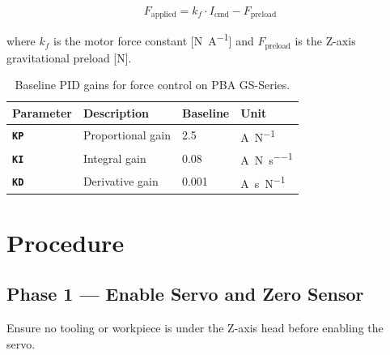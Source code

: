 \documentclass[11pt, a4paper]{article}
\newenvironment{warningbox}{%
  \begin{tcolorbox}[breakable,enhanced,colback=WarningBg,colframe=WarningOrange,
    leftrule=4pt,rightrule=0.4pt,toprule=0.4pt,bottomrule=0.4pt,arc=2pt,
    fontupper=\small,before upper={\textcolor{WarningOrange}{\textbf{\faExclamationTriangle\quad WARNING}}\par\smallskip},
    left=8pt,right=8pt,top=6pt,bottom=6pt]}{\end{tcolorbox}}
\newcommand{\acsparam}[1]{\texttt{\textcolor{ACSKeyword}{\bfseries#1}}}
\begin{document}
\begin{equation}
  F_{\text{applied}} = k_f \cdot I_{\text{cmd}} - F_{\text{preload}}
\end{equation}

where $k_f$ is the motor force constant [\si{\newton\per\ampere}] and
$F_{\text{preload}}$ is the Z-axis gravitational preload [\si{\newton}].

\begin{table}[H]
  \centering
  
  \caption{Baseline PID gains for force control on PBA GS-Series.}
  \begin{tabular}{@{} l l l l @{}}
  \toprule
  \rowcolor{PBATableHeader}
    \textbf{Parameter} & \textbf{Description} & \textbf{Baseline} & \textbf{Unit} \\
  \midrule
    \acsparam{KP} & Proportional gain & 2.5 & \si{\ampere\per\newton} \\
    \rowcolor{PBALightGray}
    \acsparam{KI} & Integral gain & 0.08 & \si{\ampere\per\newton\per\second} \\
    \acsparam{KD} & Derivative gain & 0.001 & \si{\ampere\second\per\newton} \\
  \bottomrule
  \end{tabular}
\end{table}




\section{Procedure}

\subsection{Phase 1 — Enable Servo and Zero Sensor}

\begin{warningbox}
  Ensure no tooling or workpiece is under the Z-axis head before enabling
  the servo.
\end{warningbox}
\end{document}
